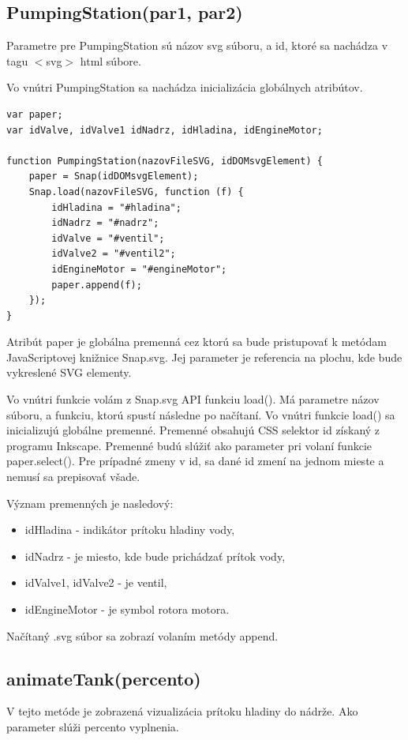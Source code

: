 \subsection{PumpingStation(par1, par2)}

Parametre pre PumpingStation sú názov svg súboru, a id, ktoré sa nachádza v tagu $<$svg$>$ html súbore.

Vo vnútri PumpingStation sa nachádza inicializácia globálnych atribútov. 
\begin{lstlisting}
var paper;
var idValve, idValve1 idNadrz, idHladina, idEngineMotor;

function PumpingStation(nazovFileSVG, idDOMsvgElement) {
	paper = Snap(idDOMsvgElement);
	Snap.load(nazovFileSVG, function (f) {
		idHladina = "#hladina";
		idNadrz = "#nadrz";
		idValve = "#ventil";
		idValve2 = "#ventil2";
		idEngineMotor = "#engineMotor";
		paper.append(f);
	});
}
\end{lstlisting}

Atribút paper je globálna premenná cez ktorú sa bude pristupovať k metódam JavaScriptovej knižnice Snap.svg. Jej parameter je referencia na plochu, kde bude vykreslené SVG elementy.

Vo vnútri funkcie volám z Snap.svg API funkciu load(). Má parametre názov súboru, a funkciu, ktorú spustí následne po načítaní. 
Vo vnútri funkcie load() sa inicializujú globálne premenné.  
Premenné obsahujú CSS selektor id získaný z programu Inkscape. Premenné budú slúžiť ako parameter pri volaní funkcie paper.select(). Pre prípadné zmeny v id, sa dané id zmení na jednom mieste a nemusí sa prepisovať všade. 

Význam premenných je nasledový: 
\begin{itemize}
	\item idHladina - indikátor prítoku hladiny vody, 
	\item idNadrz - je miesto, kde bude prichádzať prítok vody,
	\item idValve1, idValve2 - je ventil, 
	\item idEngineMotor - je symbol rotora motora.
\end{itemize}

Načítaný .svg súbor sa zobrazí volaním metódy append. 

\subsection{animateTank(percento)}
V tejto metóde je zobrazená vizualizácia prítoku hladiny do nádrže. Ako parameter slúži percento vyplnenia. 

